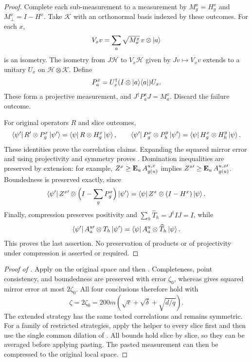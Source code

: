 \documentclass[11pt]{article}
\theoremstyle{definition}
\newcommand{\E}{\mathop{\bf E\/}}
\newcommand{\eps}{\epsilon}
\newcommand{\calH}{\mathcal{H}}
\begin{document}
\begin{proof}
Complete each sub-measurement to a measurement by
$M_g^x=H_g^x$ and $M_\bot^x=I-H^x$.  Take $\mathcal{K}$ with an
orthonormal basis indexed by these outcomes.  For each $x$,
\[
 V_xv=\sum_a\sqrt{M_a^x}\,v\otimes\ket a
\]
is an isometry.  The isometry from $J\calH$ to $V_x\calH$ given
by $Jv\mapsto V_xv$ extends to a unitary $U_x$ on
$\calH\otimes\mathcal{K}$.  Define
\[
 P_a^x=U_x^\dagger(I\otimes\ket a\!\bra a)U_x.
\]
These form a projective measurement, and
$J^\dagger P_a^xJ=M_a^x$.  Discard the failure outcome.

For original operators $R$ and slice outcomes,
\[
 \bra{\psi'}R'\otimes P_g^x\ket{\psi'}
 =\bra\psi R\otimes H_g^x\ket\psi,
 \qquad
 \bra{\psi'}P_g^x\otimes P_h^y\ket{\psi'}
 =\bra\psi H_g^x\otimes H_h^y\ket\psi.
\]
These identities prove the correlation claims.  Expanding the
squared mirror error and using projectivity and symmetry proves
.  Domination inequalities are
preserved by extension: for example, $Z^x\geq\E_uA_{g(u)}^{u,x}$
implies $Z^{x\prime}\geq\E_uA_{g(u)}^{u,x\prime}$.  Boundedness
is preserved exactly, since
\[
 \bra{\psi'}Z^{x\prime}\otimes\Bigl(I-\sum_gP_g^x\Bigr)\ket{\psi'}
 =\bra\psi Z^x\otimes(I-H^x)\ket\psi.
\]
Finally, compression preserves positivity and
$\sum_h\widehat T_h=J^\dagger I J=I$, while
\[
 \bra{\psi'}A_a^{u\prime}\otimes T_h\ket{\psi'}
 =\bra\psi A_a^u\otimes\widehat T_h\ket\psi.
\]
This proves the last assertion.  No preservation of products or of
projectivity under compression is asserted or required.
\end{proof}

\begin{proof}[Proof of ]
Apply  on the original space and
then .  Completeness,
point consistency, and boundedness are preserved with error
$\zeta_0$, whereas  gives squared
mirror error at most $2\zeta_0$.  All four conclusions therefore
hold with
\[
 \zeta=2\zeta_0=200m(\sqrt\eps+\sqrt\delta+\sqrt{d/q}).
\]
The extended strategy has the same tested correlations and remains
symmetric.  For a family of restricted strategies, apply the helper
to every slice first and then use the single common dilation of
.  All bounds hold
slice by slice, so they can be averaged before applying pasting.
The pasted measurement can then be compressed to the original
local space.
\end{proof}
\end{document}

